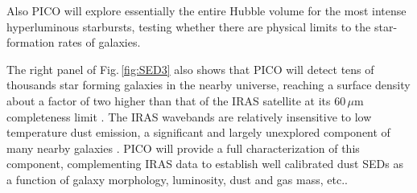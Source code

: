 \documentclass[PICOReport.tex]{subfiles}
\begin{document}
Also PICO will explore essentially the entire Hubble volume for the most
intense hyperluminous starbursts, testing whether there are physical limits to
the star-formation rates of galaxies.

The right panel of Fig.\,\ref{fig:SED3} also shows that PICO will detect tens
of thousands star forming galaxies in the nearby universe, reaching a surface
density about a factor of two higher than that of the IRAS satellite at its
$60\,\mu$m completeness limit \cite{RowanRobinson1991}. The IRAS wavebands  are
relatively insensitive to low temperature dust emission, a significant and
largely unexplored component of many nearby galaxies
\cite{Planck2011nearby_gal}. PICO will provide a full characterization of this
component, complementing IRAS data to establish well calibrated dust SEDs as a
function of galaxy morphology, luminosity, dust and gas mass, etc..
\end{document}
